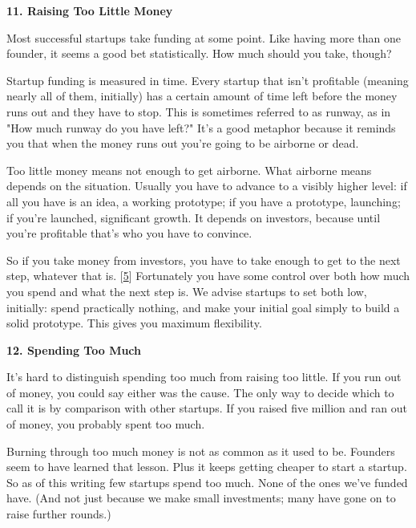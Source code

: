 \textbf{11. Raising Too Little Money}

Most successful startups take funding at some
                    point. Like having more than one founder, it seems a good
                    bet statistically. How much should you take, though?

Startup
                    funding is measured in time. Every startup that isn't
                    profitable (meaning nearly all of them, initially) has a
                    certain amount of time left before the money runs out and
                    they have to stop. This is sometimes referred to as runway,
                    as in "How much runway do you have left?" It's a good
                    metaphor because it reminds you that when the money runs out
                    you're going to be airborne or dead.

Too little
                    money means not enough to get airborne. What airborne means
                    depends on the situation. Usually you have to advance to a
                    visibly higher level: if all you have is an idea, a working
                    prototype; if you have a prototype, launching; if you're
                    launched, significant growth. It depends on investors,
                    because until you're profitable that's who you have to
                    convince.

So if you take money from investors,
                    you have to take enough to get to the next step, whatever
                    that is.
                    [\href{\#f5n}{5}]
                    Fortunately you have some control over both how much you
                    spend and what the next step is. We advise startups to set
                    both low, initially: spend practically nothing, and make
                    your initial goal simply to build a solid prototype. This
                    gives you maximum flexibility.

\textbf{12. Spending Too Much}

It's hard to distinguish spending too much from
                    raising too little. If you run out of money, you could say
                    either was the cause. The only way to decide which to call
                    it is by comparison with other startups. If you raised five
                    million and ran out of money, you probably spent too
                    much.

Burning through too much money is not as
                    common as it used to be. Founders seem to have learned that
                    lesson. Plus it keeps getting cheaper to start a startup. So
                    as of this writing few startups spend too much. None of the
                    ones we've funded have. (And not just because we make small
                    investments; many have gone on to raise further rounds.)

